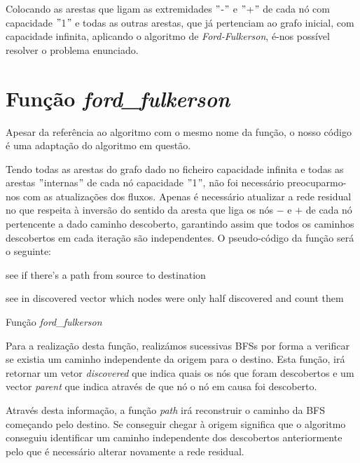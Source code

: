 \documentclass[a4paper]{article}
\begin{document}
Colocando as arestas que ligam as extremidades $"$-$"$ e $"$+$"$  de cada nó com capacidade $"$1$"$ e todas as outras arestas, que já pertenciam ao grafo inicial, com capacidade infinita, aplicando o algoritmo de \textit{Ford-Fulkerson}, é-nos possível resolver o problema enunciado.

\section{Função \textit{ford\_fulkerson}}
Apesar da referência ao algoritmo com o mesmo nome da função, o nosso código é uma adaptação do algoritmo em questão.

Tendo todas as arestas do grafo dado no ficheiro capacidade infinita e todas as arestas $"$internas$"$ de cada nó capacidade $"$1$"$, não foi necessário preocuparmo-nos com as atualizações dos fluxos. Apenas é necessário atualizar a rede residual no que respeita à inversão do sentido da aresta que liga os nós $-$ e $+$ de cada nó pertencente a dado caminho descoberto, garantindo assim que todos os caminhos descobertos em cada iteração são independentes.
\vskip 5mm
O pseudo-código da função será o seguinte:
\vskip 2mm
\begin{algorithm}[H]
	see if there's a path from source to destination\;
	
	
	see in discovered vector which nodes were only half discovered and count them\;
	
 \caption{Função \textit{ford\_fulkerson}}
\end{algorithm}
\vskip 5mm
Para a realização desta função, realizámos sucessivas BFSs por forma a verificar se existia um caminho independente da origem para o destino. Esta função, irá retornar um vetor \textit{discovered} que indica quais os nós que foram descobertos e um vector \textit{parent} que indica através de que nó o nó em causa foi descoberto.

Através desta informação, a função \textit{path} irá reconstruir o caminho da BFS começando pelo destino. Se conseguir chegar à origem significa que o algoritmo conseguiu identificar um caminho independente dos descobertos anteriormente pelo que é necessário alterar novamente a rede residual.
\end{document}
